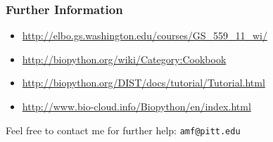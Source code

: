 \documentclass[xcolor=table,10pt,final]{beamer}
\begin{document}
\begin{frame}[fragile]
	\frametitle{Further Information}
	\begin{itemize}
		\item \url{http://elbo.gs.washington.edu/courses/GS_559_11_wi/}
		\item \url{http://biopython.org/wiki/Category:Cookbook}
		\item \url{http://biopython.org/DIST/docs/tutorial/Tutorial.html}
		\item \url{http://www.bio-cloud.info/Biopython/en/index.html}
	\end{itemize}
	\bigskip
	Feel free to contact me for further help: \texttt{amf@pitt.edu}
\end{frame}
\end{document}
